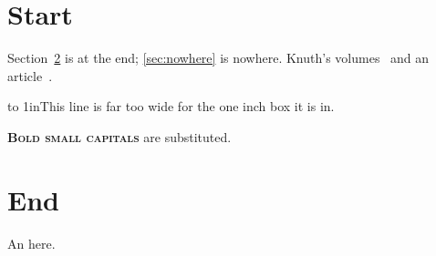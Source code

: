 \documentclass{article}
\begin{document}
\section{Start}
Section~\ref{sec:end} is at the end; \ref{sec:nowhere} is nowhere.
Knuth's volumes~\cite{whole-set} and an article~\cite{article-full}.

\hbox to 1in{This line is far too wide for the one inch box it is in.}

\textsc{\textbf{Bold small capitals}} are substituted.

\section{End}\label{sec:end}
An \undefinedcontrolsequence here.


\end{document}
